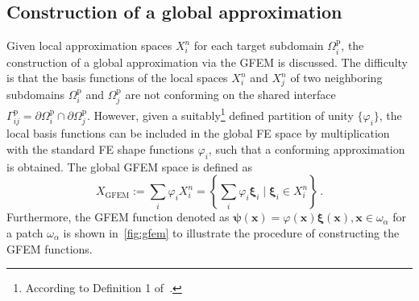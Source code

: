 \documentclass[a4paper]{eccomas_paper-2024}
\newcommand{\p}{\mathrm{p}}
\begin{document}
\subsection{Construction of a global approximation} %
\label{sub:Construction of a global approximation}
Given local approximation spaces $X^n_i$ for each target subdomain $\varOmega_i^{\p}$, the construction of a global approximation via the GFEM is discussed.
The difficulty is that the basis functions of the local spaces $X^n_i$ and $X^n_j$ of two neighboring subdomains $\varOmega_i^{\p}$ and $\varOmega_j^{\p}$ are not conforming on the shared interface $\varGamma^{\p}_{ij}=\partial\varOmega_i^{\p}\cap\partial\varOmega_j^{\p}$.
However, given a suitably\footnote{According to Definition 1 of~\cite{BABUSKA1997}.} defined partition of unity $\{{\varphi}_i\}$, the local basis functions can be included in the global FE space by multiplication with the standard FE shape functions ${\varphi}_i$, such that a conforming approximation is obtained.
The global GFEM space is defined as
\begin{equation}
	\label{eq:Xgfem}
    X_{\mathrm{GFEM}}:= \sum_{i} \varphi_iX^n_i = \left\lbrace\sum_i\varphi_i\bm\xi_i \;\big|\; \bm\xi_i\in X^n_i	\right\rbrace\,.
\end{equation}
Furthermore, the GFEM function denoted as $\bm{\psi}(\bm{x}) = \varphi(\bm{x})\bm{\xi}(\bm{x}), \bm{x}\in\omega_{\alpha}$ for a patch $\omega_{\alpha}$ is shown in~\cref{fig:gfem} to illustrate the procedure of constructing the GFEM functions.
\end{document}
